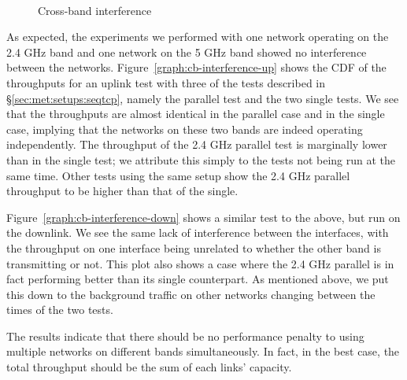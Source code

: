 \begin{figure}[h]
 \centering
 \subfloat[][uplink] {\
   \label{graph:cb-interference-up}
 }
 \\
 \subfloat[][downlink] {\
   \label{graph:cb-interference-down}
 }
 \caption{Cross-band interference}
\end{figure}

As expected, the experiments we performed with one network operating on the 2.4
GHz band and one network on the 5 GHz band showed no interference between
the networks.  Figure~\ref{graph:cb-interference-up} shows the CDF of the
throughputs for an uplink test with three of the tests described in 
\S\ref{sec:met:setups:seqtcp}, namely the parallel test and the two single tests.
 We see that the throughputs are almost identical in the parallel case and in 
the single case, implying that the networks on these two bands are indeed 
operating independently. The throughput of the 2.4 GHz parallel test is 
marginally lower than in the single test; we attribute this simply to the tests 
not being run at the same time. Other tests using the same setup show the 2.4 
GHz parallel throughput to be higher than that of the single.


Figure~\ref{graph:cb-interference-down} shows a similar test to the above, but
run on the downlink. We see the same lack of interference between the
interfaces, with the throughput on one interface being unrelated to whether the
other band is transmitting or not. This plot also shows a case where the 2.4 GHz
parallel is in fact performing better than its single counterpart. As mentioned
above, we put this down to the background traffic on other networks changing
between the times of the two tests.

The results indicate that there should be no performance penalty to using
multiple networks on different bands simultaneously. In fact, in the best case,
the total throughput should be the sum of each links' capacity.

